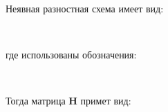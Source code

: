 \documentclass[14pt,a4paper]{scrartcl}
\begin{document}
Неявная разностная схема имеет вид:

\begin{figure}[H]
	\begin{minipage}[h]{1\linewidth}
		\\
	\end{minipage}
\end{figure}

где использованы обозначения:

\begin{figure}[H]
	\begin{minipage}[h]{1\linewidth}
		\\
	\end{minipage}
\end{figure}

\pagebreak
Тогда матрица $\mathbf{H}$ примет вид:
\end{document}
